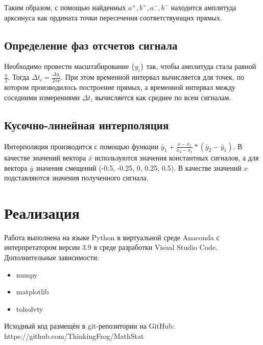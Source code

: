 \documentclass[12pt,a4paper]{article}
\begin{document}
Таким образом, с помощью найденных $a^+,b^+,a^-,b^-$ находится амплитуда арксинуса как ордината точки пересечения соответствующих прямых.

\subsection{Определение фаз отсчетов сигнала}
Необходимо провести масштабирование $\{y_i\}$ так, чтобы амплитуда стала равной $\frac{\pi}{2}$. Тогда $\Delta{t_i}=\frac{\Delta{y_i}}{2\pi\nu}$. При этом временной интервал вычисляется для точек, по котором производилось построение прямых, а временной интервал между соседними измерениями $\Delta{t_i}$ вычисляется как среднее по всем сигналам.

\subsection{Кусочно-линейная интерполяция}
Интерполяция производится с помощью функции $\bar{y}_1 + \frac{x - \bar{x}_1}{\bar{x}_2 - \bar{x}_1} * (\bar{y}_2 - \bar{y}_1)$. В качестве значений вектора $\bar{x}$ используются значения константных сигналов, а для вектора $\bar{y}$ значения смещений (-0.5, -0.25, 0, 0.25, 0.5). В качестве значений $x$ подставляются значения полученного сигнала.

\section{Реализация}
Работа выполнена на языке Python в виртуальной среде Anaconda с интерпретатором версии 3.9 в среде разработки Visual Studio Code. Дополнительные зависимости:
\begin{itemize}
    \item numpy
    \item matplotlib
    \item tolsolvty
\end{itemize}

Исходный код размещён в git-репозитории на GitHub: \\ https://github.com/ThinkingFrog/MathStat
\end{document}
